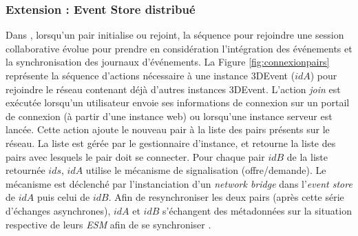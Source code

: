 %
%
%
\subsubsection{Extension : Event Store distribué}


Dans \cite{Desprat2017}, lorsqu'un pair initialise ou rejoint, la séquence pour 
rejoindre une session collaborative évolue 
pour prendre en considération l'intégration des événements et la synchronisation 
des journaux d'événements.
La Figure \ref{fig:connexionpairs} représente la séquence d'actions nécessaire à 
une instance 3DEvent ($idA$) pour rejoindre le réseau contenant déjà d'autres 
instances 3DEvent. L'action \textit{join} est exécutée lorsqu'un utilisateur envoie 
ses informations de connexion sur un portail de connexion (à partir d'une instance 
web) ou lorsqu'une instance serveur est lancée. Cette action ajoute le nouveau 
pair à la liste des pairs présents sur le réseau. La liste est gérée par le 
gestionnaire 
d'instance, et retourne la liste des pairs avec lesquels le pair doit se connecter. 
Pour chaque pair $idB$ de la liste retournée $ids$, $idA$ utilise le mécanisme de 
signalisation (offre/demande). Le mécanisme est déclenché par l'instanciation d'un 
\textit{network bridge} dans l'\textit{event store}  de $idA$ 
puis celui de $idB$. Afin de resynchroniser les deux pairs (après cette série 
d'échanges asynchrones), $idA$ et $idB$ s'échangent des métadonnées sur la 
situation respective de leurs \textit{ESM}  afin de se synchroniser 
.

